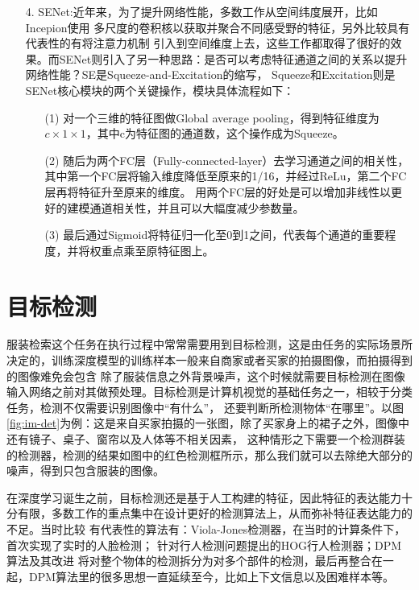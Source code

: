 \begin{itemize}

\item [4.]SENet:近年来，为了提升网络性能，多数工作从空间纬度展开，比如Incepion使用
多尺度的卷积核以获取并聚合不同感受野的特征，另外比较具有代表性的有将注意力机制
引入到空间维度上去，这些工作都取得了很好的效果。而SENet则引入了另一种思路：是否可以考虑特征通道之间的关系以提升网络性能？SE是Squeeze-and-Excitation的缩写，
Squeeze和Excitation则是SENet核心模块的两个关键操作，模块具体流程如下：
\begin{itemize}
  \item [(1)] 对一个三维的特征图做Global average pooling，得到特征维度为${c\times1\times1}$，其中c为特征图的通道数，这个操作成为Squeeze。
  \item [(2)] 随后为两个FC层（Fully-connected-layer）去学习通道之间的相关性，其中第一个FC层将输入维度降低至原来的1/16，并经过ReLu，第二个FC层再将特征升至原来的维度。
  用两个FC层的好处是可以增加非线性以更好的建模通道相关性，并且可以大幅度减少参数量。
  \item [(3)] 最后通过Sigmoid将特征归一化至0到1之间，代表每个通道的重要程度，并将权重点乘至原特征图上。
\end{itemize}
\end{itemize}

\section{目标检测}
服装检索这个任务在执行过程中常常需要用到目标检测，这是由任务的实际场景所决定的，训练深度模型的训练样本一般来自商家或者买家的拍摄图像，而拍摄得到的图像难免会包含
除了服装信息之外背景噪声，这个时候就需要目标检测在图像输入网络之前对其做预处理。目标检测是计算机视觉的基础任务之一，相较于分类任务，检测不仅需要识别图像中“有什么”，
还要判断所检测物体“在哪里”。以图\ref{fig:im-det}为例：这是来自买家拍摄的一张图，除了买家身上的裙子之外，图像中还有镜子、桌子、窗帘以及人体等不相关因素，
这种情形之下需要一个检测群装的检测器，检测的结果如图中的红色检测框所示，那么我们就可以去除绝大部分的噪声，得到只包含服装的图像。


在深度学习诞生之前，目标检测还是基于人工构建的特征，因此特征的表达能力十分有限，多数工作的重点集中在设计更好的检测算法上，从而弥补特征表达能力的不足。当时比较
有代表性的算法有：Viola-Jones检测器\cite{viola2001rapid,viola2004robust}，在当时的计算条件下，首次实现了实时的人脸检测；
针对行人检测问题提出的HOG行人检测器\cite{dalal2005histograms}；DPM算法及其改进\cite{felzenszwalb2008discriminatively,felzenszwalb2010cascade,felzenszwalb2010object}
将对整个物体的检测拆分为对多个部件的检测，最后再整合在一起，DPM算法里的很多思想一直延续至今，比如上下文信息以及困难样本等。

